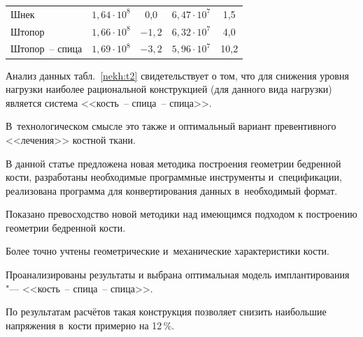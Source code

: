 \begin{table}[h!]
\begin{minipage}{.85\textwidth}
\begin{tabular}{l|c|c|c|c}
Шнек & $1,64 \cdot 10^8$ & 0,0 & $6,47 \cdot 10^7$ & 1,5 \\ 

Штопор & $1,66 \cdot 10^8$ & $-1,2$ & $6,32 \cdot 10^7$ & 4,0 \\ 

Штопор~-- спица & $1,69 \cdot 10^8$ & $-3,2$ & $5,96 \cdot 10^7$ & 10,2 \\ \hline

\end{tabular}





\end{minipage}

\end{table}





Анализ данных табл.~\ref{nekh:t2} свидетельствует о том, что для снижения уровня нагрузки наиболее рациональной конструкцией (для данного вида нагрузки) является система <<кость~-- спица~-- спица>>. 

В~технологическом смысле это также и  оптимальный вариант превентивного <<лечения>> костной ткани.



\smallskip




В данной статье предложена новая методика построения геометрии бедренной кости, разработаны необходимые программные инструменты и~спецификации, реализована программа для конвертирования данных в~необходимый формат. 

Показано превосходство новой методики над имеющимся подходом к построению геометрии бедренной кости. 

Более точно учтены геометрические и~механические характеристики кости.

Проанализированы результаты и выбрана оптимальная модель имплантирования "--- <<кость~-- спица~-- спица>>. 

По результатам расчётов такая конструкция позволяет снизить наибольшие напряжения в~кости примерно на 12\,\%.



